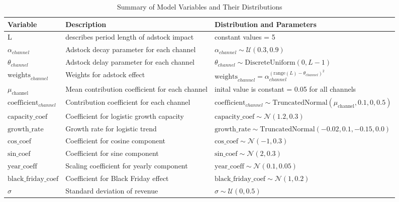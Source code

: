 \documentclass{article}
\begin{document}
\begin{table}[H]
    \small
    \centering
    \begin{tabular}{>{\raggedright}p{3cm} >{\raggedright}p{6cm} >{\raggedright\arraybackslash}p{6cm}}
        \toprule
        \textbf{Variable} & \textbf{Description} & \textbf{Distribution and Parameters} \\
        \midrule
        L & describes period length of adstock impact & constant values = 5 \\
        $\alpha_{channel}$ & Adstock decay parameter for each channel & $\alpha_{channel} \sim \mathcal{U}(0.3, 0.9)$ \\
        $\theta_{channel}$ & Adstock delay parameter for each channel & $\theta_{channel} \sim \text{DiscreteUniform}(0, L-1)$ \\
        $\text{weights}_{channel}$ & Weights for adstock effect & $\text{weights}_{channel} = \alpha_{channel}^{(\text{range}(L) - \theta_{channel})^2}$ \\
        $\mu_{\text{channel}}$ & Mean contribution coefficient for each channel & inital value is constant = 0.05 for all channels \\
        $\text{coefficient}_{channel}$ & Contribution coefficient for each channel & $\text{coefficient}_{channel} \sim \text{TruncatedNormal}(\mu_{\text{channel}}, 0.1, 0, 0.5)$ \\
        $\text{capacity\_coef}$ & Coefficient for logistic growth capacity & $\text{capacity\_coef} \sim \mathcal{N}(1.2, 0.3)$ \\
        $\text{growth\_rate}$ & Growth rate for logistic trend & $\text{growth\_rate} \sim \text{TruncatedNormal}(-0.02, 0.1, -0.15, 0.0)$ \\
        $\text{cos\_coef}$ & Coefficient for cosine component & $\text{cos\_coef} \sim \mathcal{N}(-1, 0.3)$ \\
        $\text{sin\_coef}$ & Coefficient for sine component & $\text{sin\_coef} \sim \mathcal{N}(2, 0.3)$ \\
        $\text{year\_coeff}$ & Scaling coefficient for yearly component & $\text{year\_coeff} \sim \mathcal{N}(0.1, 0.05)$ \\
        $\text{black\_friday\_coef}$ & Coefficient for Black Friday effect & $\text{black\_friday\_coef} \sim \mathcal{N}(1, 0.2)$ \\
        $\sigma$ & Standard deviation of revenue & $\sigma \sim \mathcal{U}(0, 0.5)$ \\
        \bottomrule
    \end{tabular}
    \caption{Summary of Model Variables and Their Distributions}
    \label{tab:model_variables}
\end{table}
\end{document}

